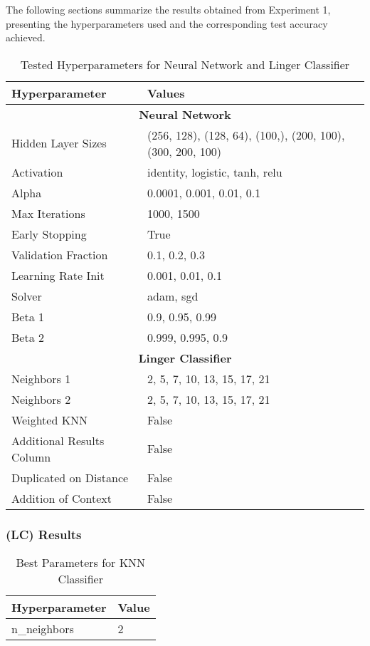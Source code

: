 \documentclass[a4paper, 12pt]{report}
\begin{document}
The following sections summarize the results obtained from Experiment 1, presenting the hyperparameters used and the corresponding test accuracy achieved.

\begin{table}[H]
    \centering
    \caption{Tested Hyperparameters for Neural Network and Linger Classifier}
    \label{tab:hyperparameters}
    \begin{tabular}{|l|l|}
    \hline
    \textbf{Hyperparameter} & \textbf{Values} \\ \hline
    \multicolumn{2}{|c|}{\textbf{Neural Network}} \\ \hline
    Hidden Layer Sizes & (256, 128), (128, 64), (100,), (200, 100), (300, 200, 100) \\ \hline
    Activation & identity, logistic, tanh, relu \\ \hline
    Alpha & 0.0001, 0.001, 0.01, 0.1 \\ \hline
    Max Iterations & 1000, 1500 \\ \hline
    Early Stopping & True \\ \hline
    Validation Fraction & 0.1, 0.2, 0.3 \\ \hline
    Learning Rate Init & 0.001, 0.01, 0.1 \\ \hline
    Solver & adam, sgd \\ \hline
    Beta 1 & 0.9, 0.95, 0.99 \\ \hline
    Beta 2 & 0.999, 0.995, 0.9 \\ \hline
    \multicolumn{2}{|c|}{\textbf{Linger Classifier}} \\ \hline
    Neighbors 1 & 2, 5, 7, 10, 13, 15, 17, 21 \\ \hline
    Neighbors 2 & 2, 5, 7, 10, 13, 15, 17, 21 \\ \hline
    Weighted KNN & False \\ \hline
    Additional Results Column & False \\ \hline
    Duplicated on Distance & False \\ \hline
    Addition of Context & False \\ \hline
    \end{tabular}
\end{table}

\subsubsection{(LC) Results}

\begin{table}[H]
    \centering
    \caption{Best Parameters for KNN Classifier}
    \label{tab:best_parameters_knn_LC_Glass}
    \begin{tabular}{|l|l|}
    \hline
    \textbf{Hyperparameter} & \textbf{Value} \\ \hline
    n\_neighbors & 2 \\ \hline
    \end{tabular}
\end{table}
\end{document}
